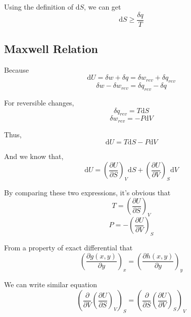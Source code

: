 \documentclass[letterpaper]{article}
\newcommand{\diff}{\mathrm{d}}
\begin{document}
Using the definition of $\diff S$, we can get
\begin{equation*}
    \boxed{\diff S\geq\frac{\delta q}{T}}
\end{equation*}

\subsection*{Maxwell Relation}
Because
\begin{equation*}
    \diff U=\delta w+\delta q=\delta w_{rev}+\delta q_{rev}
\end{equation*}
\begin{equation*}
    \delta w-\delta w_{rev}=\delta q_{rev} - \delta q
\end{equation*}

For reversible changes,
\begin{equation*}
    \delta q_{rev} = T\diff S
\end{equation*}
\begin{equation*}
    \delta w_{rev} = -P\diff V
\end{equation*}

Thus,
\begin{equation*}
    \diff U=T\diff S-P\diff V
\end{equation*}

And we know that,
\begin{equation*}
    \diff U=\left(\frac{\partial U}{\partial S}\right)_V\diff S+\left(\frac{\partial U}{\partial V}\right)_S\diff V
\end{equation*}

By comparing these two expressions, it's obvious that
\begin{equation*}
    T=\left(\frac{\partial U}{\partial S}\right)_V
\end{equation*}
\begin{equation*}
    P=-\left(\frac{\partial U}{\partial V}\right)_S
\end{equation*}

From a property of exact differential that
\begin{equation*}
    \left(\frac{\partial g(x, y)}{\partial y}\right)_x=\left(\frac{\partial h(x, y)}{\partial y}\right)_y
\end{equation*}

We can write similar equation
\begin{equation*}
    \left(\frac{\partial}{\partial V}\left(\frac{\partial U}{\partial S}\right)_V\right)_S=
    \left(\frac{\partial}{\partial S}\left(\frac{\partial U}{\partial V}\right)_S\right)_V
\end{equation*}
\end{document}
